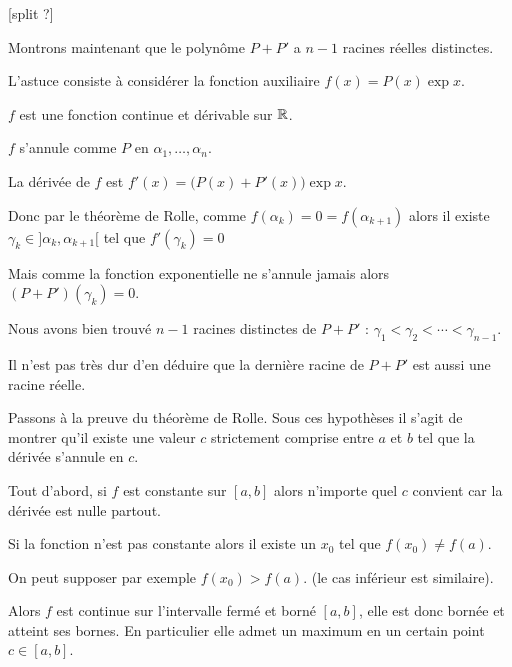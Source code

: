[split ?]


\change

Montrons maintenant que le polynôme $P+P'$ a $n-1$ racines réelles distinctes.

\change

L'astuce consiste à considérer la fonction auxiliaire $f(x)=P(x)\exp x$.

$f$ est une fonction continue et dérivable sur $\mathbb{R}$.

\change

$f$ s'annule comme $P$ en $\alpha_1,\ldots,\alpha_n$.

\change

La dérivée de $f$ est $f'(x)=\big(P(x)+P'(x)\big) \exp x$.

\change

Donc par le théorème de Rolle, comme $f(\alpha_k)=0=f(\alpha_{k+1})$ alors
il existe $\gamma_k \in ]\alpha_k,\alpha_{k+1}[$ tel que $f'(\gamma_k)=0$ 

\change

Mais comme la fonction exponentielle ne s'annule jamais alors
$(P+P')(\gamma_k)=0$. 


Nous avons bien trouvé $n-1$ racines distinctes de $P+P'$ : 
$\gamma_1 < \gamma_2 < \cdots < \gamma_{n-1}$.

Il n'est pas très dur d'en déduire que la dernière racine de $P+P'$ 
est aussi une racine réelle.



\diapo

Passons à la preuve du théorème de Rolle.
Sous ces hypothèses il s'agit de montrer qu'il existe une valeur $c$
strictement comprise entre $a$ et $b$ tel que la dérivée s'annule en $c$.

\change


Tout d'abord, si $f$ est constante sur $[a,b]$ alors n'importe quel $c$ convient
car la dérivée est nulle partout.

\change

Si la fonction n'est pas constante alors il existe un $x_0$ tel que $f(x_0) \neq f(a)$.

\change

On peut supposer par exemple $f(x_0) > f(a)$. (le cas inférieur est similaire).

\change

Alors $f$ est continue sur l'intervalle fermé et borné 
$[a,b]$, elle est donc bornée et atteint ses bornes. 
En particulier elle admet un maximum en un certain 
point $c\in[a,b]$.

